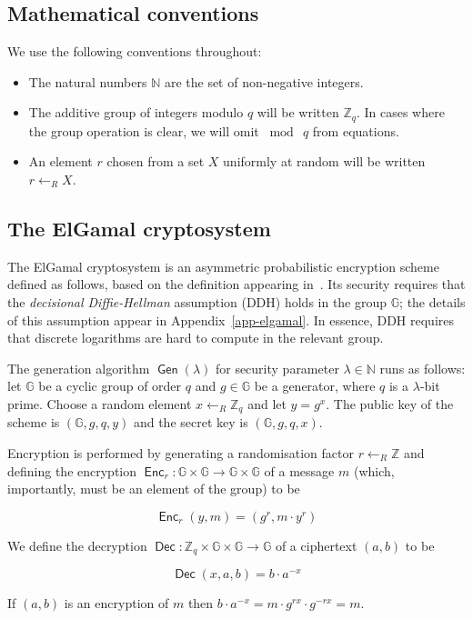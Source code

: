 \documentclass[12pt,a4paper]{article}
\DeclareMathOperator{\Gen}{\mathsf{Gen}}
\DeclareMathOperator{\Enc}{\mathsf{Enc}}
\DeclareMathOperator{\Dec}{\mathsf{Dec}}
\theoremstyle{definition}
\begin{document}
\subsection{Mathematical conventions}
We use the following conventions throughout:
\begin{itemize}
    \item The natural numbers $\mathbb{N}$ are the set of non-negative integers.
    \item The additive group of integers modulo $q$ will be written $\mathbb{Z}_q$. In cases where the group operation is clear, we will omit $\bmod\ q$ from equations.
    \item An element $r$ chosen from a set $X$ uniformly at random will be written $r\gets_R X$.
\end{itemize}
\subsection{The ElGamal cryptosystem}
The ElGamal cryptosystem is an asymmetric probabilistic encryption scheme defined as follows, based on the definition appearing in~\cite{katz2014introduction}. Its security requires that the \textit{decisional Diffie-Hellman} assumption (DDH) holds in the group $\mathbb{G}$; the details of this assumption appear in Appendix~\ref{app-elgamal}. In essence, DDH requires that discrete logarithms are hard to compute in the relevant group.

\begin{definition}\label{def-elgamal}
    The generation algorithm $\Gen(\lambda)$ for security parameter $\lambda\in\mathbb{N}$ runs as follows: let $\mathbb{G}$ be a cyclic group of order $q$ and $g\in\mathbb{G}$ be a generator, where $q$ is a $\lambda$-bit prime. Choose a random element $x\gets_R\mathbb{Z}_q$ and let $y=g^x$. 
    The public key of the scheme is $(\mathbb{G}, g, q, y)$ and the secret key is $(\mathbb{G}, g, q, x)$. 

    Encryption is performed by generating a randomisation factor $r\gets_R\mathbb{Z}$ and defining the encryption $\Enc_r:\mathbb{G}\times\mathbb{G}\rightarrow\mathbb{G}\times\mathbb{G}$ of a message $m$ (which, importantly, must be an element of the group) to be
    
    $$\Enc_r(y, m) = (g^r, m\cdot y^r)$$

    We define the decryption $\Dec:\mathbb{Z}_q\times\mathbb{G}\times\mathbb{G}\rightarrow \mathbb{G}$ of a ciphertext $(a, b)$ to be
    
    $$\Dec(x, a, b)=b\cdot a^{-x}$$

    If $(a, b)$ is an encryption of $m$ then $b\cdot a^{-x}=m\cdot g^{rx}\cdot g^{-rx}=m$.
\end{definition}
\end{document}
